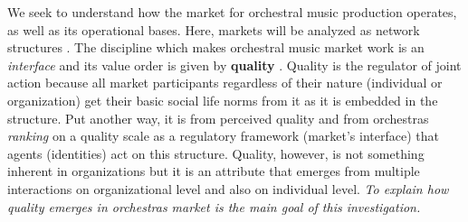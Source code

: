 \documentclass[a4paper, 12pt, openright, oneside, german, french, brazil, english, article]{abntex2}
\begin{document}
	
	We seek to understand how the market for orchestral music production operates, as well as its operational bases. Here, markets will be analyzed as network structures \cite{white2002markets}. The discipline which makes orchestral music market work is an \textit{interface} and its value order is given by \textbf{quality} \cite{white2002markets}. Quality is the regulator of joint action because all market participants regardless of their nature (individual or organization) get their basic social life norms from it as it is embedded in the structure. Put another way, it is from perceived quality and from orchestras \textit{ranking} on a quality scale as a regulatory framework (market's interface) that agents (identities) act on this structure. Quality, however, is not something inherent in organizations but it is an attribute that emerges from multiple interactions on organizational level and also on individual level. \textit{To explain how quality emerges in orchestras market is the main goal of this investigation.}
	
	
\end{document}
